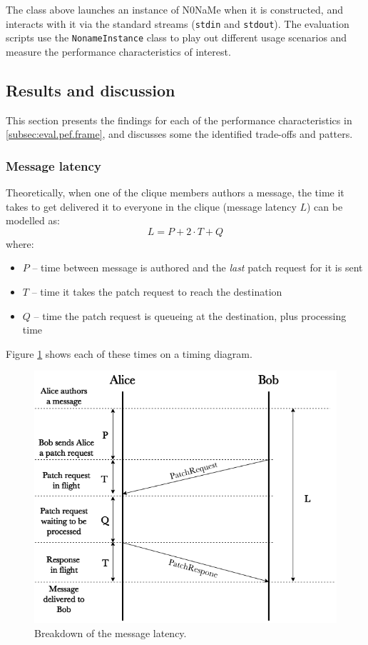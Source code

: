 \documentclass[a4paper, twoside, 12pt]{report}
\newcommand{\funkytt}{\fontfamily{AnonymousPro}\selectfont}
\begin{document}
The class above launches an instance of {\funkytt N0NaMe} when it is constructed, and interacts with it via the standard streams (\texttt{stdin} and \texttt{stdout}). The evaluation scripts use the \texttt{NonameInstance} class to play out different usage scenarios and measure the performance characteristics of interest.

\subsection{Results and discussion}
\label{subsec:eval.perf.results}
This section presents the findings for each of the performance characteristics in \cref{subsec:eval.pef.frame}, and discusses some the identified trade-offs and patters.

\subsubsection{Message latency}
Theoretically, when one of the clique members authors a message, the time it takes to get delivered it to everyone in the clique (message latency $L$) can be modelled as:
\begin{equation}
    L = P + 2 \cdot T + Q
    \label{eqn:latency}
\end{equation}
where:
\begin{itemize}
    \item $P$ -- time between message is authored and the \emph{last} patch request for it is sent
    \item $T$ -- time it takes the patch request to reach the destination
    \item $Q$ -- time the patch request is queueing at the destination, plus processing time
\end{itemize}
Figure \ref{fig:latency} shows each of these times on a timing diagram.

\begin{figure}[H]
    \captionsetup{width=1.0\textwidth}
    \centering
    \includegraphics[width=0.65\linewidth]{pics/eval/latency.png}
    \caption{\label{fig:latency} Breakdown of the message latency.}
\end{figure}
\end{document}
